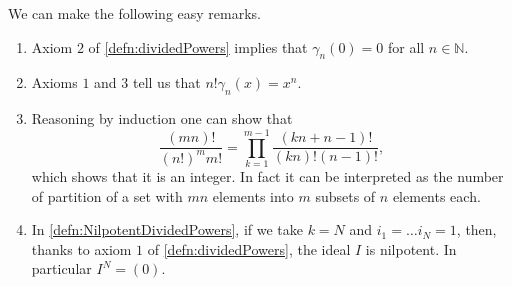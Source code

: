 \documentclass[../Main]{subfiles}
\begin{document}
\begin{rem}[]
	We can make the following easy remarks.
\begin{enumerate}
\item Axiom $2$ of \cref{defn:dividedPowers}
	implies that $\gamma_n(0) = 0$ for all $n \in \mathbb{N}$.

\item Axioms $1$ and $3$ tell us that
	$n! \gamma_n(x) = x^n$.

\item Reasoning by induction one can show that
	\begin{equation*}
		\frac{\left( mn \right)!}{\left( n! \right)^m m!} =
		\prod_{k=1}^{m-1} \frac{\left( kn + n - 1 \right)!}{(kn)! (n-1)!}
	,\end{equation*}
	which shows that it is an integer.
	In fact it can be interpreted as the number of partition of a set with $mn$
	elements into $m$ subsets of $n$ elements each.

\item In \cref{defn:NilpotentDividedPowers},
	if we take $k = N$ and $i_1 = \ldots i_N = 1$,
	then, thanks to axiom $1$ of \cref{defn:dividedPowers}, the ideal $I$
	is nilpotent.
	In particular $I^N = (0)$.
\end{enumerate}
\end{rem}
\end{document}
